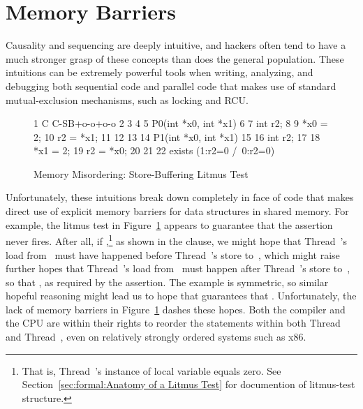 
\section{Memory Barriers}
\label{sec:advsync:Memory Barriers}

Causality and sequencing are deeply intuitive, and hackers often
tend to have a much stronger grasp of these concepts than does
the general population.
These intuitions can be extremely powerful tools when writing, analyzing,
and debugging both sequential code and parallel code that makes
use of standard mutual-exclusion mechanisms, such as locking and
RCU.

\begin{figure}
{ \scriptsize
\begin{verbbox}
 1 C C-SB+o-o+o-o
 2 {
 3 }
 4
 5 P0(int *x0, int *x1)
 6 {
 7   int r2;
 8
 9   *x0 = 2;
10   r2 = *x1;
11 }
12
13
14 P1(int *x0, int *x1)
15 {
16   int r2;
17
18   *x1 = 2;
19   r2 = *x0;
20 }
21
22 exists (1:r2=0 /\ 0:r2=0)
\end{verbbox}
}
\centering
\theverbbox
\caption{Memory Misordering: Store-Buffering Litmus Test}
\label{fig:advsync:Memory Misordering: Store-Buffering Litmus Test}
\end{figure}

Unfortunately, these intuitions break down completely in face of
code that makes direct use of explicit memory barriers for data structures
in shared memory.
For example, the litmus test in
Figure~\ref{fig:advsync:Memory Misordering: Store-Buffering Litmus Test}
appears to guarantee that the assertion never fires.
After all, if ,\footnote{
	That is, Thread~'s instance of local variable 
	equals zero.
	See Section~\ref{sec:formal:Anatomy of a Litmus Test}
	for documention of litmus-test structure.}
as shown in the  clause, we might hope that Thread~'s
load from~ must have happened before Thread~'s store to~,
which might raise
further hopes that Thread~'s load from~ must happen after
Thread~'s store to~, so that , as required by the
assertion.
The example is symmetric, so similar hopeful reasoning might lead
us to hope that  guarantees that .
Unfortunately, the lack of memory barriers in
Figure~\ref{fig:advsync:Memory Misordering: Store-Buffering Litmus Test}
dashes these hopes.
Both the compiler and the CPU are within their rights to reorder
the statements within both Thread~ and Thread~,
even on relatively strongly ordered systems such as x86.

